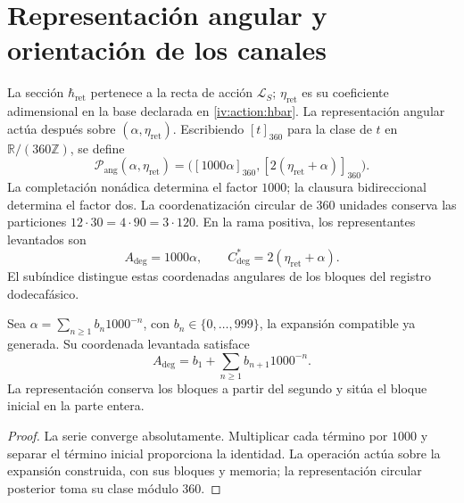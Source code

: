\section{Representación angular y orientación de los canales}
\label{iv:angular:section}

La sección \(\hbar_{\mathrm{ret}}\) pertenece a la recta de
acción \(\mathcal L_S\); \(\eta_{\mathrm{ret}}\) es su
coeficiente adimensional en la base declarada en
\eqref{iv:action:hbar}. La representación angular actúa después
sobre \((\alpha,\eta_{\mathrm{ret}})\). Escribiendo
\([t]_{360}\) para la clase de \(t\) en
\(\mathbb R/(360\mathbb Z)\), se define
\begin{equation}
 \mathcal P_{\mathrm{ang}}(\alpha,\eta_{\mathrm{ret}})
 =\bigl([1000\alpha]_{360},
        [2(\eta_{\mathrm{ret}}+\alpha)]_{360}\bigr).
 \label{iv:angular:publicacion}
\end{equation}
La completación nonádica determina el factor \(1000\); la
clausura bidireccional determina el factor dos. La coordenatización circular
de \(360\) unidades conserva las particiones
\(12\cdot30=4\cdot90=3\cdot120\). En la rama positiva, los
representantes levantados son
\begin{equation}
 A_{\deg}=1000\alpha,\qquad
 C^*_{\deg}=2(\eta_{\mathrm{ret}}+\alpha).
 \label{iv:angular:representantes}
\end{equation}
El subíndice distingue estas coordenadas angulares de los bloques
del registro dodecafásico.

\begin{proposition}
\label{iv:angular:desplazamiento}
Sea \(\alpha=\sum_{n\geq1}b_n1000^{-n}\), con
\(b_n\in\{0,\ldots,999\}\), la expansión compatible ya
generada. Su coordenada levantada satisface
\[
 A_{\deg}=b_1+\sum_{n\geq1}b_{n+1}1000^{-n}.
\]
La representación conserva los bloques a partir del segundo y
sitúa el bloque inicial en la parte entera.
\end{proposition}
\begin{proof}
La serie converge absolutamente. Multiplicar cada término por
\(1000\) y separar el término inicial proporciona la identidad.
La operación actúa sobre la expansión construida, con sus
bloques y memoria; la representación circular posterior toma
su clase módulo \(360\).
\end{proof}

